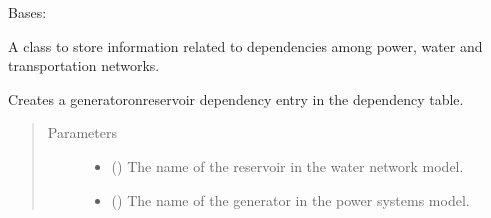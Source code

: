 \documentclass[letterpaper,10pt,english]{sphinxmanual}
\begin{document}
\begin{fulllineitems}
\label{\detokenize{apidoc:dreaminsg_integrated_model.src.network_sim_models.interdependencies.DependencyTable}}
\sphinxAtStartPar
Bases: 

\sphinxAtStartPar
A class to store information related to dependencies among power, water and transportation networks.

\begin{fulllineitems}
\label{\detokenize{apidoc:dreaminsg_integrated_model.src.network_sim_models.interdependencies.DependencyTable.add_gen_reserv_coupling}}
\sphinxAtStartPar
Creates a generator\sphinxhyphen{}on\sphinxhyphen{}reservoir dependency entry in the dependency table.
\begin{quote}\begin{description}
\item[{Parameters}] \leavevmode\begin{itemize}
\item {} 
\sphinxAtStartPar
{} () \textendash{} The name of the reservoir in the water network model.

\item {} 
\sphinxAtStartPar
{} () \textendash{} The name of the generator in the power systems model.

\end{itemize}

\end{description}\end{quote}

\end{fulllineitems}



\end{fulllineitems}
\end{document}

